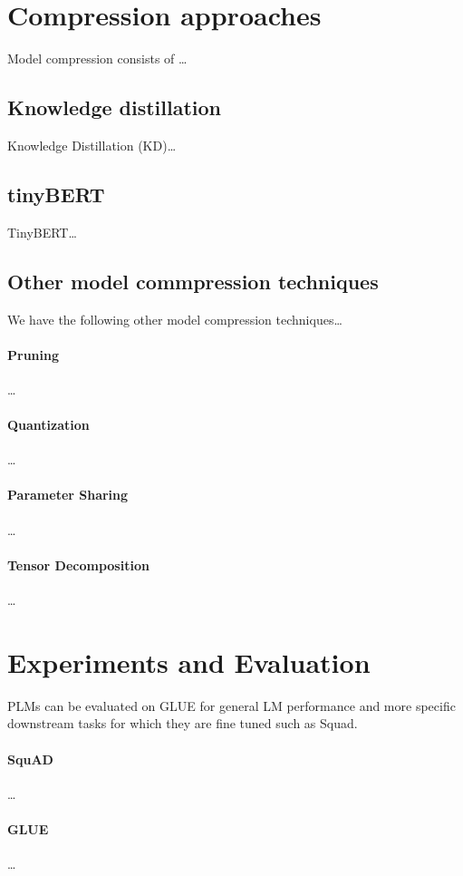 \message{ !name(projectproposal.tex)}\documentclass{article}
\begin{document}
\clearpage
\section{Compression approaches}
Model compression consists of \ldots

\subsection{Knowledge distillation}
Knowledge Distillation (KD)\ldots\cite{hinton2015distilling}

\subsection{tinyBERT}
TinyBERT\ldots\cite{tinybert}

\subsection{Other model commpression techniques}
We have the following other model compression techniques\ldots\cite{gupta2020compression}
\paragraph{Pruning}\ldots
\paragraph{Quantization}\ldots
\paragraph{Parameter Sharing}\ldots
\paragraph{Tensor Decomposition}\ldots


\section{Experiments and Evaluation}
PLMs can be evaluated on GLUE for general LM performance and more specific downstream
tasks for which they are fine tuned such as Squad.
  \paragraph{SquAD}\ldots\cite{squad}
  \paragraph{GLUE}\ldots\cite{glue}
\end{document}
